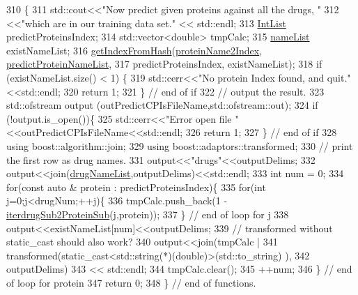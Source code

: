 \begin{DoxyCode}
310                          \{
311     std::cout<<\textcolor{stringliteral}{"Now predict given proteins against all the drugs, "}
312              <<\textcolor{stringliteral}{"which are in our training data set."} << std::endl;
313     \hyperlink{namespacegift_a786390fe70b2e3b6d61dba1014651f03}{IntList} predictProteinsIndex;
314     std::vector<double> tmpCalc;
315     \hyperlink{namespacegift_a62f85efaab3bff48335863ae0670c7a7}{nameList} existNameList;
316     \hyperlink{namespacegift_a835110af070bdfb37d092c6a7f79d65c}{getIndexFromHash}(\hyperlink{namespacegift_ad49c613c81da3c4189ea4f16915c60c5}{proteinName2Index}, 
      \hyperlink{namespacegift_a03bb78fc438e2b1af29ff3b46b70a085}{predictProteinNameList},
317                      predictProteinsIndex, existNameList);
318     \textcolor{keywordflow}{if} (existNameList.size() < 1) \{
319       std::cerr<<\textcolor{stringliteral}{"No protein Index found, and quit."} <<std::endl;
320       \textcolor{keywordflow}{return} 1;
321     \} \textcolor{comment}{// end of if}
322     \textcolor{comment}{// output the result.}
323     std::ofstream output (outPredictCPIsFileName,std::ofstream::out);
324     \textcolor{keywordflow}{if} (!output.is\_open())\{
325       std::cerr<<\textcolor{stringliteral}{"Error open file "}<<outPredictCPIsFileName<<std::endl;
326       \textcolor{keywordflow}{return} 1;
327     \} \textcolor{comment}{// end of if}
328     \textcolor{keyword}{using} boost::algorithm::join;
329     \textcolor{keyword}{using} boost::adaptors::transformed;
330     \textcolor{comment}{// print the first row as drug names.}
331     output<<\textcolor{stringliteral}{"drugs"}<<outputDelims;
332     output<<join(\hyperlink{namespacegift_a8ace6c6707676ba4866203d5ddc0a02e}{drugNameList},outputDelims)<<std::endl;
333     \textcolor{keywordtype}{int} num = 0;
334     \textcolor{keywordflow}{for}(\textcolor{keyword}{const} \textcolor{keyword}{auto} & protein : predictProteinsIndex)\{
335       \textcolor{keywordflow}{for}(\textcolor{keywordtype}{int} j=0;j<drugNum;++j)\{
336         tmpCalc.push\_back(1 - \hyperlink{classgift_1_1_e_m_a863e912e64db27bae204f088649dee39}{iterdrugSub2ProteinSub}(j,protein));
337       \} \textcolor{comment}{// end of loop for j}
338       output<<existNameList[num]<<outputDelims;
339       \textcolor{comment}{// transformed without static\_cast should also work?}
340       output<<join(tmpCalc |
341               transformed(\textcolor{keyword}{static\_cast<}std::string(*)(\textcolor{keywordtype}{double})\textcolor{keyword}{>}(std::to\_string) ),
342                    outputDelims)
343             << std::endl;
344       tmpCalc.clear();
345       ++num;
346     \} \textcolor{comment}{// end of loop for protein}
347     \textcolor{keywordflow}{return} 0;
348   \} \textcolor{comment}{// end of functions.}
\end{DoxyCode}
